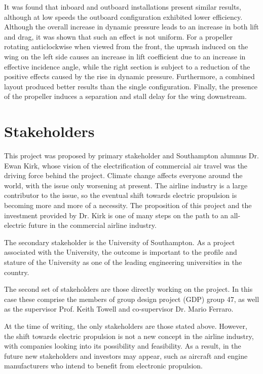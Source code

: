 \documentclass[../../main.tex]{subfiles}
\begin{document}
It was found that inboard and outboard installations present similar results, although at low speeds the outboard configuration exhibited lower efficiency.
Although the overall increase in dynamic pressure leads to an increase in both lift and drag, it was shown that such an effect is not uniform.
For a propeller rotating anticlockwise when viewed from the front, the upwash induced on the wing on the left side causes an increase in lift coefficient due to an increase in effective incidence angle, while the right section is subject to a reduction of the positive effects caused by the rise in dynamic pressure.
Furthermore, a combined layout produced better results than the single configuration.
Finally, the presence of the propeller induces a separation and stall delay for the wing downstream. 

\section{Stakeholders} \label{sec:introduction:stakeholders}


This project was proposed by primary stakeholder and Southampton alumnus Dr. Ewan Kirk, whose vision of the electrification of commercial air travel was the driving force behind the project.
Climate change affects everyone around the world, with the issue only worsening at present.
The airline industry is a large contributor to the issue, so the eventual shift towards electric propulsion is becoming more and more of a necessity.
The proposition of this project and the investment provided by Dr. Kirk is one of many steps on the path to an all-electric future in the commercial airline industry.  

The secondary stakeholder is the University of Southampton.
As a project associated with the University, the outcome is important to the profile and stature of the University as one of the leading engineering universities in the country. 

The second set of stakeholders are those directly working on the project.
In this case these comprise the members of group design project (GDP) group 47, as well as the supervisor Prof. Keith Towell and co-supervisor Dr. Mario Ferraro. 

At the time of writing, the only stakeholders are those stated above.
However, the shift towards electric propulsion is not a new concept in the airline industry, with companies looking into its possibility and feasibility.
As a result, in the future new stakeholders and investors may appear, such as aircraft and engine manufacturers who intend to benefit from electronic propulsion.
\end{document}
